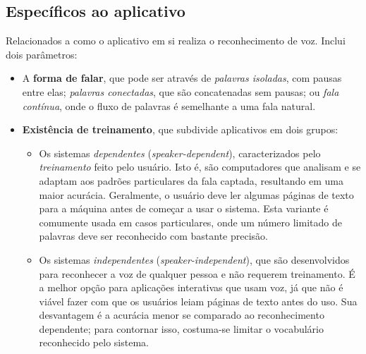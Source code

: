 
\subsection{Específicos ao aplicativo}

Relacionados a como o aplicativo em si realiza o reconhecimento de voz. Inclui dois parâmetros:

\begin{itemize}
\item A \textbf{forma de falar}, que pode ser através de \emph{palavras isoladas}, com pausas entre elas; \emph{palavras conectadas}, que são concatenadas sem pausas; ou \emph{fala contínua}, onde o fluxo de palavras é semelhante a uma fala natural.

\item \textbf{Existência de treinamento}, que subdivide aplicativos em dois grupos:

\begin{itemize}[label=\small\bullet]
\item Os sistemas \emph{dependentes} (\textit{speaker-dependent}), caracterizados pelo \emph{treinamento} feito pelo usuário. Isto é, são computadores que analisam e se adaptam aos padrões particulares da fala captada, resultando em uma maior acurácia. Geralmente, o usuário deve ler algumas páginas de texto para a máquina antes de começar a usar o sistema. Esta variante é comumente usada em casos particulares, onde um número limitado de palavras deve ser reconhecido com bastante precisão.

\item Os sistemas \emph{independentes} (\textit{speaker-independent}), que são desenvolvidos para reconhecer a voz de qualquer pessoa e não requerem treinamento. É a melhor opção para aplicações interativas que usam voz, já que não é viável fazer com que os usuários leiam páginas de texto antes do uso. Sua desvantagem é a acurácia menor se comparado ao reconhecimento dependente; para contornar isso, costuma-se limitar o vocabulário reconhecido pelo sistema.
\end{itemize}

\end{itemize}


